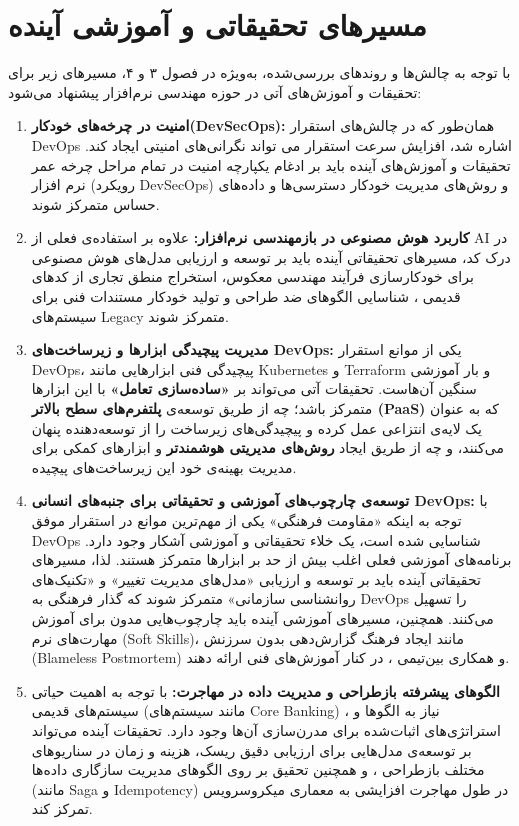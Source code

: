 \section{مسیرهای تحقیقاتی و آموزشی آینده}
\label{sec:ch6-future-work}

با توجه به چالش‌ها و روندهای بررسی‌شده، به‌ویژه در فصول ۳ و ۴، مسیرهای زیر برای تحقیقات و آموزش‌های آتی در حوزه مهندسی نرم‌افزار پیشنهاد می‌شود:

\begin{enumerate}
  \item \textbf{امنیت در چرخه‌های خودکار(DevSecOps):} همان‌طور که در چالش‌های استقرار DevOps اشاره شد، افزایش سرعت استقرار می تواند نگرانی‌های امنیتی ایجاد کند. تحقیقات و آموزش‌های آینده باید بر ادغام یکپارچه امنیت در تمام مراحل چرخه عمر نرم افزار (رویکرد DevSecOps) و روش‌های مدیریت خودکار دسترسی‌ها و داده‌های حساس متمرکز شوند.
  \item \textbf{کاربرد هوش مصنوعی در بازمهندسی نرم‌افزار:} علاوه بر استفاده‌ی فعلی از AI در درک کد، مسیرهای تحقیقاتی آینده باید بر توسعه و ارزیابی مدل‌های هوش مصنوعی برای خودکارسازی فرآیند مهندسی معکوس، استخراج منطق تجاری از کدهای قدیمی ، شناسایی الگوهای ضد طراحی و تولید خودکار مستندات فنی برای سیستم‌های Legacy متمرکز شوند.
  \item \textbf{مدیریت پیچیدگی ابزارها و زیرساخت‌های DevOps:} یکی از موانع استقرار DevOps، پیچیدگی فنی ابزارهایی مانند Kubernetes و Terraform و بار آموزشی سنگین آن‌هاست. تحقیقات آتی می‌تواند بر \textbf{«ساده‌سازی تعامل»} با این ابزارها متمرکز باشد؛ چه از طریق توسعه‌ی \textbf{پلتفرم‌های سطح بالاتر (PaaS)} که به عنوان یک لایه‌ی انتزاعی عمل کرده و پیچیدگی‌های زیرساخت را از توسعه‌دهنده پنهان می‌کنند، و چه از طریق ایجاد \textbf{روش‌های مدیریتی هوشمندتر }و ابزارهای کمکی برای مدیریت بهینه‌ی خود این زیرساخت‌های پیچیده.
  \item \textbf{توسعه‌ی چارچوب‌های آموزشی و تحقیقاتی برای جنبه‌های انسانی DevOps:} با توجه به اینکه «مقاومت فرهنگی» یکی از مهم‌ترین موانع در استقرار موفق DevOps شناسایی شده است، یک خلاء تحقیقاتی و آموزشی آشکار وجود دارد. برنامه‌های آموزشی فعلی اغلب بیش از حد بر ابزارها متمرکز هستند. لذا، مسیرهای تحقیقاتی آینده باید بر توسعه و ارزیابی «مدل‌های مدیریت تغییر» و «تکنیک‌های روانشناسی سازمانی» متمرکز شوند که گذار فرهنگی به DevOps را تسهیل می‌کنند. همچنین، مسیرهای آموزشی آینده باید چارچوب‌هایی مدون برای آموزش مهارت‌های نرم (Soft Skills)، مانند ایجاد فرهنگ گزارش‌دهی بدون سرزنش (Blameless Postmortem) و همکاری بین‌تیمی ، در کنار آموزش‌های فنی ارائه دهند.
  \item \textbf{الگوهای پیشرفته بازطراحی و مدیریت داده در مهاجرت:} با توجه به اهمیت حیاتی سیستم‌های قدیمی (مانند سیستم‌های Core Banking) ، نیاز به الگوها و استراتژی‌های اثبات‌شده برای مدرن‌سازی آن‌ها وجود دارد. تحقیقات آینده می‌تواند بر توسعه‌ی مدل‌هایی برای ارزیابی دقیق ریسک، هزینه و زمان در سناریوهای مختلف بازطراحی ، و همچنین تحقیق بر روی الگوهای مدیریت سازگاری داده‌ها (مانند Saga و Idempotency) در طول مهاجرت افزایشی به معماری میکروسرویس تمرکز کند.

\end{enumerate}
